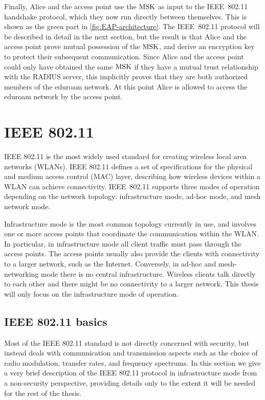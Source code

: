 \begin{example}
Finally,
Alice and the access point use the $\mathrm{MSK}$ as input to the IEEE~802.11 handshake protocol, 
which they now run directly between themselves. 
This is shown as the green part in \cref{fig:EAP-architecture}.
The IEEE~802.11 protocol will be described in detail in the next section,
but the result is that Alice and the access point prove mutual possession of the $\mathrm{MSK}$,
and derive an encryption key to protect their subsequent communication.
Since Alice and the access point could only have obtained the same $\mathrm{MSK}$ if they have a mutual trust relationship with the RADIUS server,
this implicitly proves that they are both authorized members of the eduroam network.
At this point Alice is allowed to access the eduroam network by the access point. 
\end{example}




\section{IEEE 802.11}\label{sec:descriptions:EAP_&_802.11:802:11}


IEEE 802.11 \cite{IEEE:2012:802.11} is the most widely used standard for creating wireless local area networks (WLANs).
IEEE 802.11 defines a set of specifications for the physical and medium access control (MAC) layer,
describing how wireless devices within a WLAN can achieve connectivity. 
IEEE~802.11 supports three modes of operation depending on the network topology: 
infrastructure mode,
ad-hoc mode,
and mesh network mode.

Infrastructure mode is the most common topology currently in use,
and involves one or more access points that coordinate the communication within the WLAN.
In particular,
in infrastructure mode all client traffic must pass through the access points.
The access points usually also provide the clients with connectivity to a larger network, such as the Internet. 
Conversely, 
in ad-hoc and mesh-networking mode there is no central infrastructure.
Wireless clients talk directly to each other and there might be no connectivity to a larger network. 
This thesis will only focus on the infrastructure mode of operation.


\subsection{IEEE 802.11 basics}\label{sec:802.11:non_security_basics}
Most of the IEEE 802.11 standard is not directly concerned with security,
but instead deals with communication and transmission aspects such as the choice of radio modulation,
transfer rates, and
frequency spectrums. 
In this section we give a very brief description of the IEEE 802.11 protocol in infrastructure mode from a non-security perspective,
providing details only to the extent it will be needed for the rest of the thesis.



